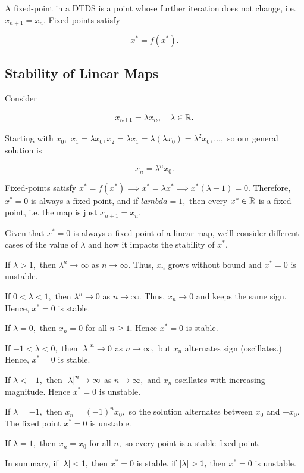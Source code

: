 \documentclass{article}
\begin{document}
A \@{fixed-point} in a DTDS is a point whose further iteration does not change, i.e. $x_{n+1} = x_n.$ Fixed points satisfy

\[ x^* = f(x^*). \]

\subsection{Stability of Linear Maps}

Consider

\[ x_{n+1} = \lambda x_n, \quad \lambda \in \mathbb{R}. \]

Starting with $x_0,$ $x_1 = \lambda x_0, x_2 = \lambda x_1 = \lambda ( \lambda x_0) = \lambda^2 x_0, \dots,$ so our general solution is

\[ x_n = \lambda^n x_0. \]

\@{Fixed-points} satisfy $x^* = f(x^*) \implies x^* = \lambda x^* \implies x^*(\lambda - 1) = 0.$ Therefore, $x^* = 0$ is always a fixed point, and if $lambda = 1,$ then every $x^* \in \mathbb{R}$ is a fixed point, i.e. the map is just $x_{n+1} = x_n.$ 

Given that $x^* = 0$ is always a \@{fixed-point} of a linear map, we'll consider different cases of the value of $\lambda$ and how it impacts the stability of $x^*.$

If $\lambda > 1,$ then $\lambda^n \to \infty$ as $n \to \infty.$ Thus, $x_n$ grows without bound and $x^* = 0$ is \@{unstable}.

If $0 < \lambda < 1,$ then $\lambda^n \to 0$ as $n \to \infty.$ Thus, $x_n \to 0$ and keeps the same sign. Hence, $x^* = 0$ is \@{stable}.

If $\lambda = 0,$ then $x_n = 0$ for all $n \geq 1.$ Hence $x^* = 0$ is stable.

If $-1 < \lambda < 0,$ then $\left| \lambda \right|^n \to 0$ as $n \to \infty,$ but $x_n$ alternates sign (oscillates.) Hence, $x^* = 0$ is stable.

If $\lambda < -1,$ then $\left| \lambda \right|^n \to \infty$ as $n \to \infty,$ and $x_n$ oscillates with increasing magnitude. Hence $x^* = 0$ is unstable.

If $\lambda = -1,$ then $x_n = (-1)^n x_0,$ so the solution alternates between $x_0$ and $-x_0.$ The fixed point $x^* = 0$ is unstable.

If $\lambda = 1,$ then $x_n = x_0$ for all $n,$ so every point is a stable fixed point.

In summary, if $\left| \lambda \right| < 1,$ then $x^* = 0$ is stable. if $\left| \lambda \right| > 1,$ then $x^* = 0$ is unstable.



\end{document}
